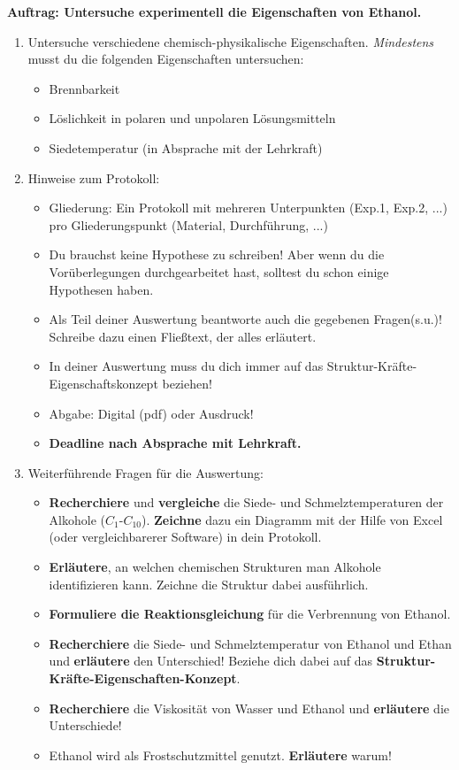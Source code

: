 \documentclass{scrartcl}  %
\begin{document}
				\noindent \textbf{Auftrag: Untersuche experimentell die Eigenschaften von Ethanol.}
				\begin{enumerate}
					\item Untersuche verschiedene chemisch-physikalische Eigenschaften. \textit{Mindestens} musst du die folgenden Eigenschaften untersuchen:
						\begin{itemize}
							\item Brennbarkeit
							\item Löslichkeit in polaren und unpolaren Lösungsmitteln
							\item Siedetemperatur (in Absprache mit der Lehrkraft)
						\end{itemize}
					\item Hinweise zum Protokoll:
						\begin{itemize}
							\item Gliederung: Ein Protokoll mit mehreren Unterpunkten (Exp.1, Exp.2, ...) pro Gliederungspunkt (Material, Durchführung, ...)
							\item Du brauchst keine Hypothese zu schreiben! Aber wenn du die Vorüberlegungen durchgearbeitet hast, solltest du schon einige Hypothesen haben.
							\item  Als Teil deiner Auswertung beantworte auch die gegebenen Fragen(s.u.)! Schreibe dazu einen Fließtext, der alles erläutert.
							\item In deiner Auswertung muss du dich immer auf das Struktur-Kräfte-Eigenschaftskonzept beziehen!
							\item Abgabe: Digital (pdf) oder Ausdruck!
							\item \textbf{Deadline nach Absprache mit Lehrkraft.}
						\end{itemize}
					\item Weiterführende Fragen für die Auswertung:
						\begin{itemize}
							\item \textbf{Recherchiere} und \textbf{vergleiche} die Siede- und Schmelztemperaturen der Alkohole ($ C_{1} $-$ C_{10} $). \textbf{Zeichne} dazu ein Diagramm mit der Hilfe von Excel (oder vergleichbarerer Software) in dein Protokoll.
							\item \textbf{Erläutere}, an welchen chemischen Strukturen man Alkohole identifizieren kann. Zeichne die Struktur dabei ausführlich.
							\item \textbf{Formuliere die Reaktionsgleichung} für die Verbrennung von Ethanol. %
							\item \textbf{Recherchiere} die Siede- und Schmelztemperatur von Ethanol und Ethan und \textbf{erläutere} den Unterschied! Beziehe dich dabei auf das \textbf{Struktur-Kräfte-Eigenschaften-Konzept}.
							\item \textbf{Recherchiere} die Viskosität von Wasser und Ethanol und \textbf{erläutere} die Unterschiede!
							\item Ethanol wird als Frostschutzmittel genutzt. \textbf{Erläutere} warum!
						\end{itemize}
				\end{enumerate}
\end{document}
